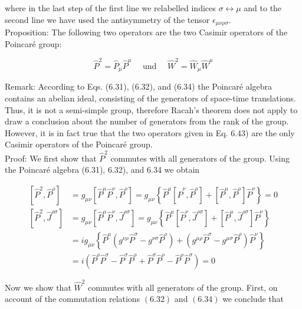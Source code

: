 \documentclass[10pt, letterpaper]{article}
\begin{document}
where in the last step of the first line we relabelled indices $\sigma \leftrightarrow \mu$ and to the second line we have used the antisymmetry of the tensor $\epsilon_{\mu \nu \rho \sigma}$.\\
Proposition: The following two operators are the two Casimir operators of the Poincaré group:

$$
\hat{P}^{2}=\hat{P}_{\mu} \hat{P}^{\mu} \quad \text { und } \quad \hat{W}^{2}=\hat{W}_{\mu} \hat{W}^{\mu}
$$

Remark: According to Eqs. (6.31), (6.32), and (6.34) the Poincaré algebra contains an abelian ideal, consisting of the generators of space-time translations. Thus, it is not a semi-simple group, therefore Racah's theorem does not apply to draw a conclusion about the number of generators from the rank of the group. However, it is in fact true that the two operators given in Eq. 6.43) are the only Casimir operators of the Poincaré group.\\
Proof: We first show that $\hat{P}^{2}$ commutes with all generators of the group. Using the Poincaré algebra (6.31), 6.32), and 6.34 we obtain

$$
\begin{aligned}
{\left[\hat{P}^{2}, \hat{P}^{\rho}\right] } & =g_{\mu \nu}\left[\hat{P}^{\mu} \hat{P}^{\nu}, \hat{P}^{\rho}\right]=g_{\mu \nu}\left\{\hat{P}^{\mu}\left[\hat{P}^{\nu}, \hat{P}^{\rho}\right]+\left[\hat{P}^{\mu}, \hat{P}^{\rho}\right] \hat{P}^{\nu}\right\}=0 \\
{\left[\hat{P}^{2}, \hat{J}^{\rho \sigma}\right] } & =g_{\mu \nu}\left[\hat{P}^{\mu} \hat{P}^{\nu}, \hat{J}^{\rho \sigma}\right]=g_{\mu \nu}\left\{\hat{P}^{\mu}\left[\hat{P}^{\nu}, \hat{J}^{\rho \sigma}\right]+\left[\hat{P}^{\mu}, \hat{J}^{\rho \sigma}\right] \hat{P}^{\nu}\right\} \\
& =i g_{\mu \nu}\left\{\hat{P}^{\mu}\left(g^{\nu \rho} \hat{P}^{\sigma}-g^{\nu \sigma} \hat{P}^{\rho}\right)+\left(g^{\mu \rho} \hat{P}^{\sigma}-g^{\mu \sigma} \hat{P}^{\rho}\right) \hat{P}^{\nu}\right\} \\
& =i\left(\hat{P}^{\rho} \hat{P}^{\sigma}-\hat{P}^{\sigma} \hat{P}^{\rho}+\hat{P}^{\sigma} \hat{P}^{\rho}-\hat{P}^{\rho} \hat{P}^{\sigma}\right)=0
\end{aligned}
$$

Now we show that $\hat{W}^{2}$ commutes with all generators of the group. First, on account of the commutation relations $(\boxed{6.32})$ and $(6.34)$ we conclude that
\end{document}
